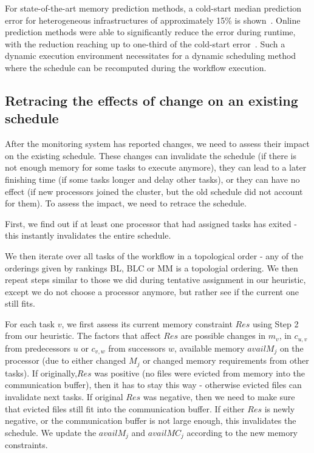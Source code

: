 \documentclass[conference]{IEEEtran}
\begin{document}
    For state-of-the-art memory prediction methods, a cold-start median prediction error for heterogeneous infrastructures of approximately 15\% is shown~\cite{TODO}.
    Online prediction methods were able to significantly reduce the error during runtime, with the reduction reaching up to one-third of the cold-start error~\cite{baderDiedrichDynamic2023,witt2019learning}.
    Such a dynamic execution environment necessitates for a dynamic scheduling method where the schedule can be recomputed during the workflow execution.

    \subsection*{Retracing the effects of change on an existing schedule}
    After the monitoring system has reported changes, we need to assess their impact on the existing schedule.
    These changes can invalidate the schedule (\eg if there is not enough memory for some tasks to execute anymore),
    they can lead to a later finishing time (\eg if some tasks longer and delay other tasks), or they can have no effect (\eg if new processors
    joined the cluster, but the old schedule did not account for them).
    To assess the impact, we need to retrace the schedule.

    First, we find out if at least one processor that had assigned tasks has exited - this instantly invalidates the
    entire schedule.

    We then iterate over all tasks of the workflow in a topological order - any of the orderings given by rankings BL, BLC or MM
    is a topologial ordering.
    We then repeat steps similar to those we did during tentative assignment in our heuristic, except we do not choose a processor
    anymore, but rather see if the current one still fits.

    For each task $v$, we first assess its current memory constraint $Res$ using Step 2 from our heuristic.
    The factors that affect $Res$ are possible changes in $m_v$, in $c_{u,v}$ from predecessors $u$ or $c_{v,w}$ from successors $w$,
    available memory $availM_j$ on the processor (due to either changed $M_j$ or changed memory requirements from other tasks).
    If originally,$Res$ was positive (no files were evicted from memory into the communication buffer), then it has to stay this way -
    otherwise evicted files can invalidate next tasks.
    If original $Res$ was negative, then we need to make sure that evicted files still fit into the communication buffer.
    If either $Res$ is newly negative, or the communication buffer is not large enough, this invalidates the schedule.
    We update the $availM_j$ and $availMC_j$ according to the new memory constraints.
\end{document}

